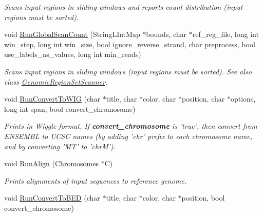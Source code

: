 \begin{CompactItemize}
\begin{CompactList}\small\item\em Scans input regions in sliding windows and reports count distribution (input regions must be sorted). \item\end{CompactList}\item 
void \hyperlink{classGenomicRegionSet_45cac26bedec4d983127b93d2096f735}{RunGlobalScanCount} (StringLIntMap $\ast$bounds, char $\ast$ref\_\-reg\_\-file, long int win\_\-step, long int win\_\-size, bool ignore\_\-reverse\_\-strand, char preprocess, bool use\_\-labels\_\-as\_\-values, long int min\_\-reads)
\begin{CompactList}\small\item\em Scans input regions in sliding windows (input regions must be sorted). See also class \hyperlink{classGenomicRegionSetScanner}{GenomicRegionSetScanner}. \item\end{CompactList}\item 
\hypertarget{classGenomicRegionSet_6377c10b1e9903ff5ae3b0ff9fe20e4d}{
void \hyperlink{classGenomicRegionSet_6377c10b1e9903ff5ae3b0ff9fe20e4d}{RunConvertToWIG} (char $\ast$title, char $\ast$color, char $\ast$position, char $\ast$options, long int span, bool convert\_\-chromosome)}
\label{classGenomicRegionSet_6377c10b1e9903ff5ae3b0ff9fe20e4d}

\begin{CompactList}\small\item\em Prints in Wiggle format. If {\bf convert\_\-chromosome} is 'true', then convert from ENSEMBL to UCSC names (by adding 'chr' prefix to each chromosome name, and by converting 'MT' to 'chrM'). \item\end{CompactList}\item 
\hypertarget{classGenomicRegionSet_da3da7ef918c09867341cda32881d63e}{
void \hyperlink{classGenomicRegionSet_da3da7ef918c09867341cda32881d63e}{RunAlign} (\hyperlink{classChromosomes}{Chromosomes} $\ast$C)}
\label{classGenomicRegionSet_da3da7ef918c09867341cda32881d63e}

\begin{CompactList}\small\item\em Prints alignments of input sequences to reference genome. \item\end{CompactList}\item 
\hypertarget{classGenomicRegionSet_18669fb4dfdf1287aaf9cfceb8329cb5}{
void \hyperlink{classGenomicRegionSet_18669fb4dfdf1287aaf9cfceb8329cb5}{RunConvertToBED} (char $\ast$title, char $\ast$color, char $\ast$position, bool convert\_\-chromosome)}
\label{classGenomicRegionSet_18669fb4dfdf1287aaf9cfceb8329cb5}


\end{CompactItemize}
